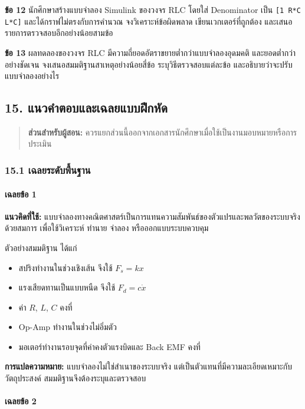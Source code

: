 \textbf{ข้อ 12} นักศึกษาสร้างแบบจำลอง Simulink ของวงจร RLC โดยใส่ Denominator เป็น \texttt{[1 R*C L*C]} และได้กราฟไม่ตรงกับการคำนวณ จงวิเคราะห์ข้อผิดพลาด เขียนเวกเตอร์ที่ถูกต้อง และเสนอรายการตรวจสอบอีกอย่างน้อยสามข้อ

\textbf{ข้อ 13} ผลทดลองของวงจร RLC มีความถี่ยอดอัตราขยายต่ำกว่าแบบจำลองอุดมคติ และยอดต่ำกว่าอย่างชัดเจน จงเสนอสมมติฐานสาเหตุอย่างน้อยสี่ข้อ ระบุวิธีตรวจสอบแต่ละข้อ และอธิบายว่าจะปรับแบบจำลองอย่างไร

\newpage

\subsection{15. แนวคำตอบและเฉลยแบบฝึกหัด}

\begin{quote}
\textbf{ส่วนสำหรับผู้สอน:} ควรแยกส่วนนี้ออกจากเอกสารนักศึกษาเมื่อใช้เป็นงานมอบหมายหรือการประเมิน
\end{quote}

\subsubsection{15.1 เฉลยระดับพื้นฐาน}

\paragraph{เฉลยข้อ 1}

\textbf{แนวคิดที่ใช้:} แบบจำลองทางคณิตศาสตร์เป็นการแทนความสัมพันธ์ของตัวแปรและพลวัตของระบบจริงด้วยสมการ เพื่อใช้วิเคราะห์ ทำนาย จำลอง หรือออกแบบระบบควบคุม

ตัวอย่างสมมติฐาน ได้แก่

\begin{itemize}
    \item สปริงทำงานในช่วงเชิงเส้น จึงใช้ $F_s=kx$
    \item แรงเสียดทานเป็นแบบหนืด จึงใช้ $F_d=c\dot{x}$
    \item ค่า $R$, $L$, $C$ คงที่
    \item Op-Amp ทำงานในช่วงไม่อิ่มตัว
    \item มอเตอร์ทำงานรอบจุดที่ค่าคงตัวแรงบิดและ Back EMF คงที่
\end{itemize}

\textbf{การแปลความหมาย:} แบบจำลองไม่ใช่สำเนาของระบบจริง แต่เป็นตัวแทนที่มีความละเอียดเหมาะกับวัตถุประสงค์ สมมติฐานจึงต้องระบุและตรวจสอบ

\paragraph{เฉลยข้อ 2}


